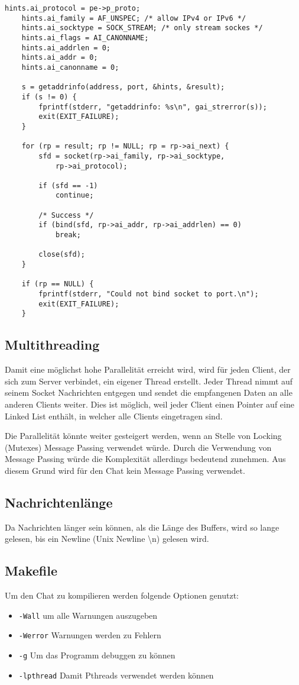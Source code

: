 \documentclass[a4paper]{article}
\begin{document}
\begin{verbatim}
hints.ai_protocol = pe->p_proto;
    hints.ai_family = AF_UNSPEC; /* allow IPv4 or IPv6 */
    hints.ai_socktype = SOCK_STREAM; /* only stream sockes */
    hints.ai_flags = AI_CANONNAME;
    hints.ai_addrlen = 0;
    hints.ai_addr = 0;
    hints.ai_canonname = 0;

    s = getaddrinfo(address, port, &hints, &result);
    if (s != 0) {
        fprintf(stderr, "getaddrinfo: %s\n", gai_strerror(s));
        exit(EXIT_FAILURE);
    }

    for (rp = result; rp != NULL; rp = rp->ai_next) {
        sfd = socket(rp->ai_family, rp->ai_socktype,
            rp->ai_protocol);

        if (sfd == -1)
            continue;

        /* Success */
        if (bind(sfd, rp->ai_addr, rp->ai_addrlen) == 0)
            break;

        close(sfd);
    }

    if (rp == NULL) {
        fprintf(stderr, "Could not bind socket to port.\n");
        exit(EXIT_FAILURE);
    }
\end{verbatim}

\subsection{Multithreading}
Damit eine möglichst hohe Parallelität erreicht wird, wird für jeden Client, der sich zum Server verbindet, ein eigener Thread erstellt. Jeder Thread nimmt auf seinem Socket Nachrichten entgegen und sendet die empfangenen Daten an alle anderen Clients weiter. Dies ist möglich, weil jeder Client einen Pointer auf eine Linked List enthält, in welcher alle Clients eingetragen sind.

Die Parallelität könnte weiter gesteigert werden, wenn an Stelle von Locking (Mutexes) Message Passing verwendet würde. Durch die Verwendung von Message Passing würde die Komplexität allerdings bedeutend zunehmen. Aus diesem Grund wird für den Chat kein Message Passing verwendet.

\subsection{Nachrichtenlänge}
Da Nachrichten länger sein können, als die Länge des Buffers, wird so lange gelesen, bis ein Newline (Unix Newline \textbackslash n) gelesen wird.

\subsection{Makefile}
Um den Chat zu kompilieren werden folgende Optionen genutzt:
\begin{itemize}
    \item \texttt{-Wall} um alle Warnungen auszugeben
    \item \texttt{-Werror} Warnungen werden zu Fehlern
    \item \texttt{-g} Um das Programm debuggen zu können
    \item \texttt{-lpthread} Damit Pthreads verwendet werden können
\end{itemize}
\end{document}

